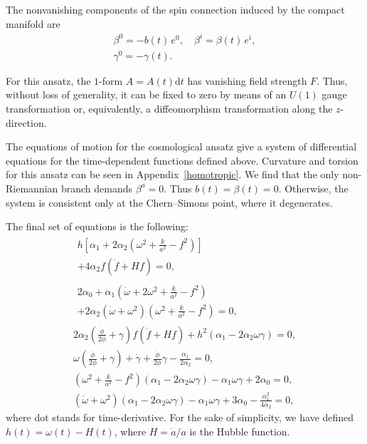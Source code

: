 \documentclass[aps,prd,12pt,superscriptaddress,showpacs,showkeys,longbibliography,reprint,nofootinbib]{revtex4-1}
\begin{document}
The nonvanishing components of the spin connection induced by the compact manifold are
\begin{gather}
  \beta^0 = -b(t) \, e^0,\quad \beta^i = \beta(t) \, e^i,\\
  \label{gamma cosmo}
  \gamma^0 =-\gamma(t).
\end{gather}

For this ansatz, the $1$-form $A = A(t)\text{d}t$ has vanishing field strength $F$. Thus, without loss of generality, it can be fixed to zero by means of an $U(1)$ gauge transformation or, equivalently, a diffeomorphism transformation along the $z$-direction.

The equations of motion for the cosmological ansatz give a system of differential equations for the time-dependent functions defined above. Curvature and torsion for this ansatz can be seen in Appendix~\ref{homotropic}. We find that the only non-Riemannian branch demands  $\beta^a=0$. Thus $b(t)=\beta(t)=0$. Otherwise, the system is consistent only at the Chern--Simons point, where it degenerates. 

The final set of equations is the following:
\setlength\multlinegap{0pt}
\begin{gather}
  \label{eqn1}
  \begin{multlined}
    h\left[\alpha_1+2\alpha_2\left(\omega^2+\frac{k}{a^2}-f^2\right)\right] \\
    +4\alpha_2f\left(\dot{f}+Hf\right)=0,
  \end{multlined}
  \\
  \begin{multlined}
    2\alpha_0+\alpha_1\left(\dot{\omega}+2\omega^2+\frac{k}{a^2}-f^2\right)\\
    +2\alpha_2\left(\dot{\omega}+\omega^2\right)\left(\omega^2+\frac{k}{a^2}-f^2\right)=0,
  \end{multlined}
  \\
  2\alpha_2\left(\tfrac{\dot{\phi}}{2\phi}+\gamma\right)f\left(\dot{f}+Hf\right)
  +h^2\left(\alpha_1-2\alpha_2\omega\gamma\right)=0,
  \\
  \omega\left(\frac{\dot{\phi}}{2\phi}+\gamma\right)+\dot{\gamma}+\frac{\dot{\phi}}{2\phi}\gamma-\frac{\alpha_1}{2\alpha_2}=0,
  \\
  \left(\omega^2+\tfrac{k}{a^2}-f^2\right)\left(\alpha_1-2\alpha_2\omega\gamma\right)-\alpha_1\omega\gamma+2\alpha_0=0,
  \\
  \label{eqn2}
  \left(\dot{\omega}+\omega^2\right)\left(\alpha_1-2\alpha_2\omega\gamma\right)-\alpha_1
  \omega\gamma+3\alpha_0 - \frac{\alpha^2_1}{4\alpha_2}=0,
\end{gather}
where dot stands for time-derivative. For the sake of simplicity, we have defined $h(t)=\omega(t)-H(t)$, where $H=\dot{a}/a$ is the Hubble function.
\end{document}
